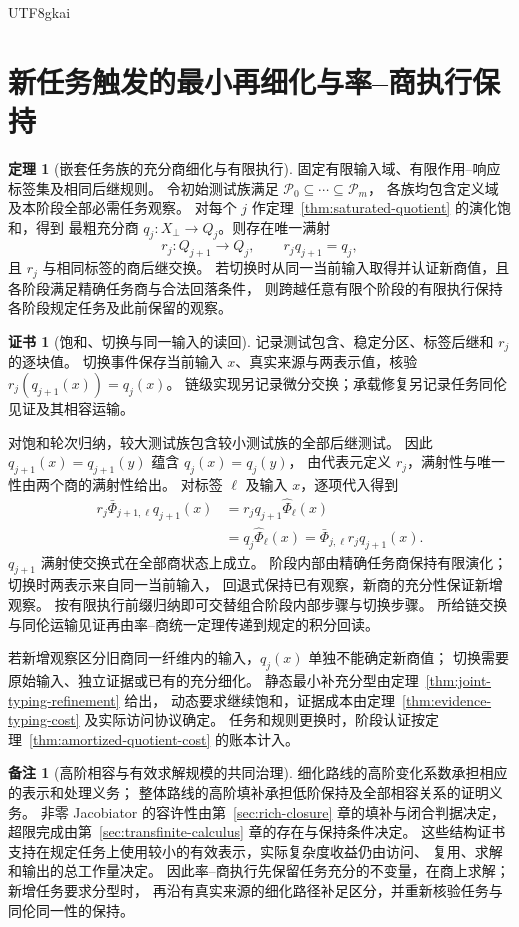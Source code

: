 \documentclass[12pt]{report}
\makeatletter
\theoremstyle{definition}
\newtheorem{theorem}{定理}[chapter]
\newtheorem{remark}{备注}[chapter]
\newtheorem{Certificate}{证书}[chapter]
\renewenvironment{proof}[1][\proofname]{\par
  \pushQED{\qed}\normalfont
  \topsep6\p@\@plus6\p@\relax
  \trivlist
  \item[\hskip\labelsep\normalfont #1\@addpunct{.}]\ignorespaces
}{
  \popQED\endtrivlist\@endpefalse
}
\makeatother
\begin{document}
\begin{CJK*}{UTF8}{gkai}
\section{新任务触发的最小再细化与率--商执行保持}
\begin{theorem}[嵌套任务族的充分商细化与有限执行]
\label{thm:task-directed-refinement}
固定有限输入域、有限作用--响应标签集及相同后继规则。
令初始测试族满足 \(\mathcal P_0\subseteq\cdots\subseteq\mathcal P_m\)，
各族均包含定义域及本阶段全部必需任务观察。
对每个 \(j\) 作定理~\ref{thm:saturated-quotient} 的演化饱和，得到
最粗充分商 \(q_j:X_\bot\to Q_j\)。则存在唯一满射
\[
r_j:Q_{j+1}\to Q_j,\qquad r_jq_{j+1}=q_j,
\]
且 \(r_j\) 与相同标签的商后继交换。
若切换时从同一当前输入取得并认证新商值，且各阶段满足精确任务商与合法回落条件，
则跨越任意有限个阶段的有限执行保持各阶段规定任务及此前保留的观察。
\end{theorem}
\begin{Certificate}[饱和、切换与同一输入的读回]
记录测试包含、稳定分区、标签后继和 \(r_j\) 的逐块值。
切换事件保存当前输入 \(x\)、真实来源与两表示值，核验
\(r_j(q_{j+1}(x))=q_j(x)\)。
链级实现另记录微分交换；承载修复另记录任务同伦见证及其相容运输。
\end{Certificate}
\begin{proof}
对饱和轮次归纳，较大测试族包含较小测试族的全部后继测试。
因此 \(q_{j+1}(x)=q_{j+1}(y)\) 蕴含 \(q_j(x)=q_j(y)\)，
由代表元定义 \(r_j\)，满射性与唯一性由两个商的满射性给出。
对标签 \(\ell\) 及输入 \(x\)，逐项代入得到
\[
\begin{aligned}
r_j\bar\Phi_{j+1,\ell}q_{j+1}(x)
&=r_jq_{j+1}\widehat\Phi_\ell(x)\\
&=q_j\widehat\Phi_\ell(x)
=\bar\Phi_{j,\ell}r_jq_{j+1}(x).
\end{aligned}
\]
\(q_{j+1}\) 满射使交换式在全部商状态上成立。
阶段内部由精确任务商保持有限演化；切换时两表示来自同一当前输入，
回退式保持已有观察，新商的充分性保证新增观察。
按有限执行前缀归纳即可交替组合阶段内部步骤与切换步骤。
所给链交换与同伦运输见证再由率--商统一定理传递到规定的积分回读。
\end{proof}
若新增观察区分旧商同一纤维内的输入，\(q_j(x)\) 单独不能确定新商值；
切换需要原始输入、独立证据或已有的充分细化。
静态最小补充分型由定理~\ref{thm:joint-typing-refinement} 给出，
动态要求继续饱和，证据成本由定理~\ref{thm:evidence-typing-cost} 及实际访问协议确定。
任务和规则更换时，阶段认证按定理~\ref{thm:amortized-quotient-cost} 的账本计入。

\begin{remark}[高阶相容与有效求解规模的共同治理]
细化路线的高阶变化系数承担相应的表示和处理义务；
整体路线的高阶填补承担低阶保持及全部相容关系的证明义务。
非零 Jacobiator 的容许性由第~\ref{sec:rich-closure} 章的填补与闭合判据决定，
超限完成由第~\ref{sec:transfinite-calculus} 章的存在与保持条件决定。
这些结构证书支持在规定任务上使用较小的有效表示，实际复杂度收益仍由访问、
复用、求解和输出的总工作量决定。
因此率--商执行先保留任务充分的不变量，在商上求解；新增任务要求分型时，
再沿有真实来源的细化路径补足区分，并重新核验任务与同伦同一性的保持。
\end{remark}


\end{CJK*}
\end{document}
